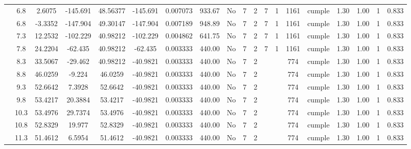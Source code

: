 \begin{table}[H]
{\begin{tabular}{|c|c|c|c|c|c|r|c|c|c|c|c|c|c|c|c|c|c|c|}
\cline{2-19}    & \cellcolor[rgb]{ .851,  .882,  .949}6.8 & 2.6075 & -145.691 & 48.56377 & -145.691 & 0.007073 & 933.67 & No  & 7   & 2   & 7   & 1   & 1161 & \cellcolor[rgb]{ .776,  .937,  .808}cumple & 1.30 & 1.00 & 1   & 0.833 \bigstrut\\
\cline{2-19}    & \cellcolor[rgb]{ .851,  .882,  .949}6.8 & -3.3352 & -147.904 & 49.30147 & -147.904 & 0.007189 & 948.89 & No  & 7   & 2   & 7   & 1   & 1161 & \cellcolor[rgb]{ .776,  .937,  .808}cumple & 1.30 & 1.00 & 1   & 0.833 \bigstrut\\
\cline{2-19}    & 7.3 & 12.2532 & -102.229 & 40.98212 & -102.229 & 0.004862 & 641.75 & No  & 7   & 2   & 7   & 1   & 1161 & \cellcolor[rgb]{ .776,  .937,  .808}cumple & 1.30 & 1.00 & 1   & 0.833 \bigstrut\\
\cline{2-19}    & 7.8 & 24.2204 & -62.435 & 40.98212 & -62.435 & 0.003333 & 440.00 & No  & 7   & 2   & 7   & 1   & 1161 & \cellcolor[rgb]{ .776,  .937,  .808}cumple & 1.30 & 1.00 & 1   & 0.833 \bigstrut\\
\cline{2-19}    & 8.3 & 33.5067 & -29.462 & 40.98212 & -40.9821 & 0.003333 & 440.00 & No  & 7   & 2   &     &     & 774 & \cellcolor[rgb]{ .776,  .937,  .808}cumple & 1.30 & 1.00 & 1   & 0.833 \bigstrut\\
\cline{2-19}    & 8.8 & 46.0259 & -9.224 & 46.0259 & -40.9821 & 0.003333 & 440.00 & No  & 7   & 2   &     &     & 774 & \cellcolor[rgb]{ .776,  .937,  .808}cumple & 1.30 & 1.00 & 1   & 0.833 \bigstrut\\
\cline{2-19}    & 9.3 & 52.6642 & 7.3928 & 52.6642 & -40.9821 & 0.003333 & 440.00 & No  & 7   & 2   &     &     & 774 & \cellcolor[rgb]{ .776,  .937,  .808}cumple & 1.30 & 1.00 & 1   & 0.833 \bigstrut\\
\cline{2-19}    & 9.8 & 53.4217 & 20.3884 & 53.4217 & -40.9821 & 0.003333 & 440.00 & No  & 7   & 2   &     &     & 774 & \cellcolor[rgb]{ .776,  .937,  .808}cumple & 1.30 & 1.00 & 1   & 0.833 \bigstrut\\
\cline{2-19}    & 10.3 & 53.4976 & 29.7374 & 53.4976 & -40.9821 & 0.003333 & 440.00 & No  & 7   & 2   &     &     & 774 & \cellcolor[rgb]{ .776,  .937,  .808}cumple & 1.30 & 1.00 & 1   & 0.833 \bigstrut\\
\cline{2-19}    & 10.8 & 52.8329 & 19.977 & 52.8329 & -40.9821 & 0.003333 & 440.00 & No  & 7   & 2   &     &     & 774 & \cellcolor[rgb]{ .776,  .937,  .808}cumple & 1.30 & 1.00 & 1   & 0.833 \bigstrut\\
\cline{2-19}    & 11.3 & 51.4612 & 6.5954 & 51.4612 & -40.9821 & 0.003333 & 440.00 & No  & 7   & 2   &     &     & 774 & \cellcolor[rgb]{ .776,  .937,  .808}cumple & 1.30 & 1.00 & 1   & 0.833 \bigstrut\\

\end{tabular}}
\end{table}
